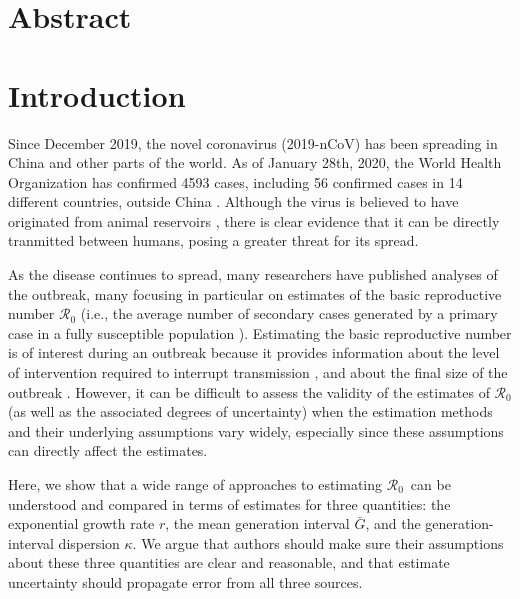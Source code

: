 \documentclass[12pt]{article}
\date{\today}
\newcommand{\Rx}[1]{\ensuremath{{\mathcal R}_{#1}}}
\newcommand{\Ro}{\Rx{0}}
\begin{document}
\begin{flushleft}{
	\Large
	\textbf{}
}

\bigskip

\end{flushleft}

\section*{Abstract}

\pagebreak

\section{Introduction}

Since December 2019, the novel coronavirus (2019-nCoV) has been spreading in China and other parts of the world.
As of January 28th, 2020, the World Health Organization has confirmed 4593 cases, including 56 confirmed cases in 14 different countries, outside China \citep{who28report}.
Although the virus is believed to have originated from animal reservoirs \citep{cdcncov}, 
there is clear evidence that it can be directly tranmitted between humans,
posing a greater threat for its spread.

As the disease continues to spread, many researchers have published analyses of the outbreak, many focusing in particular on estimates of the basic reproductive number $\mathcal R_0$ (i.e., the average number of secondary cases generated by a primary case in a fully susceptible population \citep{anderson1991infectious, diekmann1990definition}).
Estimating the basic reproductive number is of interest during an outbreak because it provides information about the level of intervention required to interrupt transmission \citep{anderson1991infectious}, and about the final size of the outbreak \citep{anderson1991infectious, ma2006generality}.
However, it can be difficult to assess the validity of the estimates of $\mathcal R_0$ (as well as the associated degrees of uncertainty) when the estimation methods and their underlying assumptions vary widely, especially since these assumptions can directly affect the estimates.

Here, we show that a wide range of approaches to estimating \Ro\ can be understood and compared in terms of estimates for three quantities: the exponential growth rate $r$, the mean generation interval $\bar G$, and the generation-interval dispersion $\kappa$. We argue that authors should make sure their assumptions about these three quantities are clear and reasonable, and that estimate uncertainty should propagate error from all three sources. 
\end{document}
